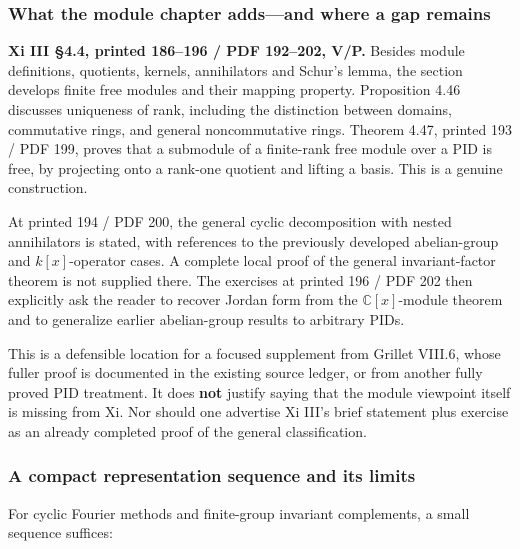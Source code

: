 \documentclass[
  11pt,
]{article}
\begin{document}
\subsubsection{What the module chapter adds---and where a gap
remains}\label{what-the-module-chapter-addsand-where-a-gap-remains}

\textbf{Xi III §4.4, printed 186--196 / PDF 192--202, V/P.} Besides
module definitions, quotients, kernels, annihilators and Schur's lemma,
the section develops finite free modules and their mapping property.
Proposition 4.46 discusses uniqueness of rank, including the distinction
between domains, commutative rings, and general noncommutative rings.
Theorem 4.47, printed 193 / PDF 199, proves that a submodule of a
finite-rank free module over a PID is free, by projecting onto a
rank-one quotient and lifting a basis. This is a genuine construction.

At printed 194 / PDF 200, the general cyclic decomposition with nested
annihilators is stated, with references to the previously developed
abelian-group and \(k[x]\)-operator cases. A complete local proof of the
general invariant-factor theorem is not supplied there. The exercises at
printed 196 / PDF 202 then explicitly ask the reader to recover Jordan
form from the \(\mathbb C[x]\)-module theorem and to generalize earlier
abelian-group results to arbitrary PIDs.

This is a defensible location for a focused supplement from Grillet
VIII.6, whose fuller proof is documented in the existing source ledger,
or from another fully proved PID treatment. It does \textbf{not} justify
saying that the module viewpoint itself is missing from Xi. Nor should
one advertise Xi III's brief statement plus exercise as an already
completed proof of the general classification.

\subsubsection{A compact representation sequence and its
limits}\label{a-compact-representation-sequence-and-its-limits}

For cyclic Fourier methods and finite-group invariant complements, a
small sequence suffices:
\end{document}
